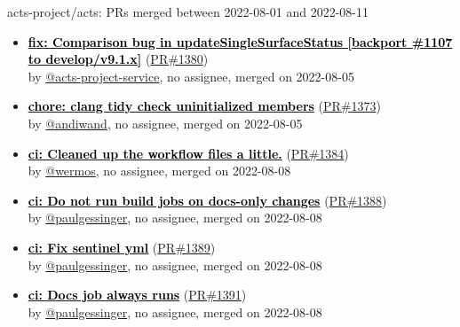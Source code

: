 \begin{frame}[allowframebreaks]{ acts-project/acts: PRs merged 
between 2022-08-01 and 2022-08-11
}
\begin{itemize}
    \item\prmerged
    \hspace*{0.1em}
    \textbf{\href{https://github.com/acts-project/acts/pull/1380}{\textcolor{black}{fix: Comparison bug in updateSingleSurfaceStatus [backport \#1107 to develop/v9.1.x]}}}
    (\href{https://github.com/acts-project/acts/pull/1380}{PR\#1380}) \\
    by \href{https://github.com/acts-project-service}{@acts-project-service}, {}no assignee, merged on 2022-08-05

    \item\prmerged
    \hspace*{0.1em}
    \textbf{\href{https://github.com/acts-project/acts/pull/1373}{\textcolor{black}{chore: clang tidy check uninitialized members}}}
    (\href{https://github.com/acts-project/acts/pull/1373}{PR\#1373}) \\
    by \href{https://github.com/andiwand}{@andiwand}, {}no assignee, merged on 2022-08-05

    \item\prmerged
    \hspace*{0.1em}
    \textbf{\href{https://github.com/acts-project/acts/pull/1384}{\textcolor{black}{ci: Cleaned up the workflow files a little.}}}
    (\href{https://github.com/acts-project/acts/pull/1384}{PR\#1384}) \\
    by \href{https://github.com/wermos}{@wermos}, {}no assignee, merged on 2022-08-08

    \item\prmerged
    \hspace*{0.1em}
    \textbf{\href{https://github.com/acts-project/acts/pull/1388}{\textcolor{black}{ci: Do not run build jobs on docs-only changes}}}
    (\href{https://github.com/acts-project/acts/pull/1388}{PR\#1388}) \\
    by \href{https://github.com/paulgessinger}{@paulgessinger}, {}no assignee, merged on 2022-08-08

    \item\prmerged
    \hspace*{0.1em}
    \textbf{\href{https://github.com/acts-project/acts/pull/1389}{\textcolor{black}{ci: Fix sentinel yml}}}
    (\href{https://github.com/acts-project/acts/pull/1389}{PR\#1389}) \\
    by \href{https://github.com/paulgessinger}{@paulgessinger}, {}no assignee, merged on 2022-08-08

    \item\prmerged
    \hspace*{0.1em}
    \textbf{\href{https://github.com/acts-project/acts/pull/1391}{\textcolor{black}{ci: Docs job always runs}}}
    (\href{https://github.com/acts-project/acts/pull/1391}{PR\#1391}) \\
    by \href{https://github.com/paulgessinger}{@paulgessinger}, {}no assignee, merged on 2022-08-08


\end{itemize}
\end{frame}
